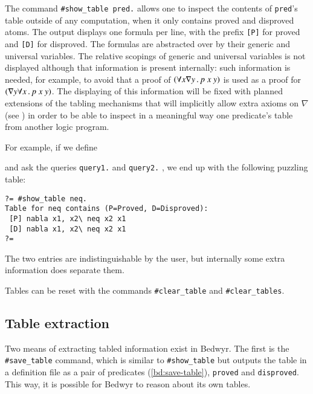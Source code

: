 The command \lstinline+#show_table pred.+ allows one to inspect the
contents of \lstinline+pred+'s table outside of any computation, when it
only contains proved and disproved atoms.  The output displays one
formula per line, with the prefix \texttt{[P]} for proved and
\texttt{[D]} for disproved.  The formulas are abstracted over by their
generic and universal variables.  The relative scopings of generic and
universal variables is not displayed although that information is
present internally: such information is needed, for example, to avoid
that a proof of $(\forall x\nabla y\, .\, p~x~y)$ is used as a proof for
$(\nabla y\forall x\, .\, p~x~y)$.  The displaying of this information will
be fixed with planned extensions of the tabling mechanisms that will
implicitly allow extra axioms on $\nabla$ (see \cite{tiu06lfmtp}) in
order to be able to inspect in a meaningful way one predicate's table
from another logic program.

For example, if we define
\begin{center}\end{center}
and ask the queries \lstinline+query1.+ and \lstinline+query2.+ , we end
up with the following puzzling table:
\begin{center}\begin{lstlisting}[style=bedwyr-repl]
?= #show_table neq.
Table for neq contains (P=Proved, D=Disproved):
 [P] nabla x1, x2\ neq x2 x1
 [D] nabla x1, x2\ neq x2 x1
?=
\end{lstlisting}\end{center}
The two entries are indistinguishable by the user, but internally some
extra information does separate them.

Tables can be reset with the commands \lstinline+#clear_table+ and
\lstinline+#clear_tables+.

\subsection{Table extraction}

Two means of extracting tabled information exist in Bedwyr.  The first
is the \lstinline+#save_table+ command, which is similar to
\lstinline+#show_table+ but outputs the table in a definition file as a
pair of predicates (\autoref{bd:save-table}), \lstinline+proved+ and
\lstinline+disproved+.  This way, it is possible for Bedwyr to reason
about its own tables.

